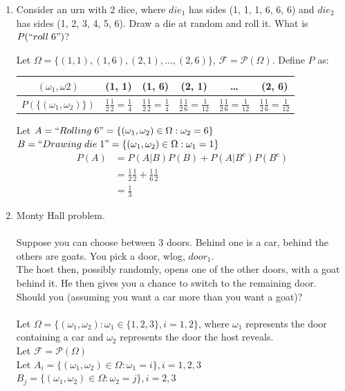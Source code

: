 \documentclass{article}
\begin{document}
	\begin{myex}{}{}
		\begin{enumerate}
			\item Consider an urn with 2 dice, where $die_1$ has sides (1, 1, 1, 6, 6, 6) and $die_2$ has sides (1, 2, 3, 4, 5, 6). Draw a die at random and roll it. What is $P(``roll\;6")$?
		
			Let $\Omega=\{(1, 1), (1, 6), (2, 1), \dots, (2, 6)\}$, $\mathcal{F}=\mathcal{P}(\Omega)$. Define $P$ as:\\
			\begin{center}
				\begin{tabular}{c|c|c|c|c|c} 
					 $(\omega_1, \omega2)$ & (1, 1) & (1, 6) & (2, 1) & \dots & (2, 6) \\
					 \hline
	$P(\{(\omega_1, \omega_2)\})$ & $\frac{1}{2}\frac{1}{2}=\frac{1}{4}$ & $\frac{1}{2}\frac{1}{2}=\frac{1}{4}$ & $\frac{1}{2}\frac{1}{6}=\frac{1}{12}$ & $\frac{1}{2}\frac{1}{6}=\frac{1}{12}$ & $\frac{1}{2}\frac{1}{6}=\frac{1}{12}$
				\end{tabular}
			\end{center}
			
			Let $A=``Rolling\;6"=\{(\omega_1, \omega_2)\in\Omega : \omega_2=6\}$\\
			$B=``Drawing\;die\;1"=\{(\omega_1, \omega_2)\in\Omega : \omega_1=1\}$
			\begin{align*}
				P(A)&=P(A|B)P(B)+P(A|B^c)P(B^c)\\
				&=\frac{1}{2}\frac{1}{2}+\frac{1}{6}\frac{1}{2}\\
				&=\frac{1}{3}
			\end{align*}
			
			\item Monty Hall problem.\\\\
			Suppose you can choose between 3 doors. Behind one is a car, behind the others are goats. You pick a door, wlog, $door_1$.\\
			The host then, possibly randomly, opens one of the other doors, with a goat behind it. He then gives you a chance to switch to the remaining door. Should you (assuming you want a car more than you want a goat)?\\\\
			Let $\Omega=\{(\omega_1, \omega_2) : \omega_1\in\{1, 2, 3\}, i=1, 2\}$, where $\omega_1$ represents the door containing a car and $\omega_2$ represents the door the host reveals.\\
			Let $\mathcal{F}=\mathcal{P}(\Omega)$\\
			Let $A_i=\{(\omega_1, \omega_2)\in\Omega : \omega_1=i\}, i=1, 2, 3$\\
			$B_j=\{(\omega_1, \omega_2)\in\Omega : \omega_2=j\}, i=2, 3$\\
			

\end{enumerate}
\end{myex}
\end{document}
